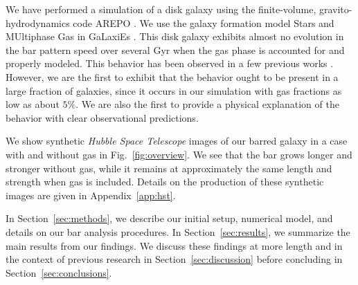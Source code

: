 \documentclass[fleqn,usenatbib]{mnras}
\newcommand{\RCR}{\ensuremath{R_{\textrm{CR}}}}
\newcommand{\Rot}{\ensuremath{\mathcal{R}}}
\begin{document}
We have performed a simulation of a disk galaxy using the finite-volume,
gravito-hydrodynamics code AREPO \citep{2010MNRAS.401..791S}. We use the galaxy
formation model Stars and MUltiphase Gas in GaLaxiEs
\citep[SMUGGLE;][]{2019MNRAS.489.4233M}. This disk galaxy exhibits almost no
evolution in the bar pattern speed over several Gyr when the gas phase is
accounted for and properly modeled. This behavior has been observed in a few
previous works \citep{1993AA...268...65F, 2010ApJ...719.1470V,
2014MNRAS.438L..81A}. However, we are the first to exhibit that the behavior
ought to be present in a large fraction of galaxies, since it occurs in our
simulation with gas fractions as low as about $5\%$. We are also the first to
provide a physical explanation of the behavior with clear observational
predictions.

We show synthetic \textit{Hubble Space Telescope} images of our barred galaxy in
a case with and without gas in Fig.~\ref{fig:overview}. We see that the bar
grows longer and stronger without gas, while it remains at approximately the
same length and strength when gas is included. Details on the production of
these synthetic images are given in Appendix~\ref{app:hst}.


In Section~\ref{sec:methods}, we describe our initial setup, numerical model,
and details on our bar analysis procedures. In Section~\ref{sec:results}, we
summarize the main results from our findings. We discuss these findings at more
length and in the context of previous research in Section~\ref{sec:discussion}
before concluding in Section~\ref{sec:conclusions}.

\end{document}
